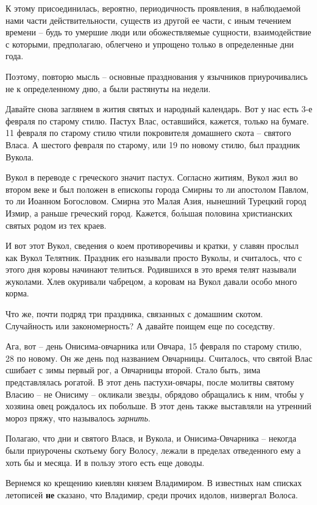    К этому присоединилась, вероятно, периодичность проявления, в наблюдаемой нами части действительности, существ из другой ее части, с иным течением времени – будь то умершие люди или обожествляемые сущности, взаимодействие с которыми, предполагаю, облегчено и упрощено только в определенные дни года.

   Поэтому, повторю мысль – основные празднования у язычников приурочивались не к определенному дню, а были растянуты на недели.

   Давайте снова заглянем в жития святых и народный календарь. Вот у нас есть 3-е февраля по старому стилю. Пастух Влас, оставшийся, кажется, только на бумаге. 11 февраля по старому стилю чтили покровителя домашнего скота – святого Власа. А шестого февраля по старому, или 19 по новому стилю, был праздник Вукола.

   Вукол в переводе с греческого значит пастух. Согласно житиям, Вукол жил во втором веке и был положен в епископы города Смирны то ли апостолом Павлом, то ли Иоанном Богословом. Смирна это Малая Азия, нынешний Турецкий город Измир, а раньше греческий город. Кажется, бо\'льшая половина христианских святых родом из тех краев.

   И вот этот Вукол, сведения о коем противоречивы и кратки, у славян прослыл как Вукол Телятник. Праздник его называли просто Вуколы, и считалось, что с этого дня коровы начинают телиться. Родившихся в это время телят называли жуколами. Хлев окуривали чабрецом, а коровам на Вукол давали особо много корма.

   Что же, почти подряд три праздника, связанных с домашним скотом. Случайность или закономерность? А давайте поищем еще по соседству.

   Ага, вот – день Онисима-овчарника или Овчара, 15 февраля по старому стилю, 28 по новому. Он же день под названием Овчарницы. Считалось, что святой Влас сшибает с зимы первый рог, а Овчарницы второй. Стало быть, зима представлялась рогатой. В этот день пастухи-овчары, после молитвы святому Власию – не Онисиму – окликали звезды, обрядово обращались к ним, чтобы у хозяина овец рождалось их побольше. В этот день также выставляли на утренний мороз пряжу, что называлось \textit{ зарнить}.

   Полагаю, что дни и святого Власв, и Вукола, и Онисима-Овчарника – некогда были приурочены скотьему богу Волосу, лежали в пределах отведенного ему а хоть бы и месяца. И в пользу этого есть еще доводы.

   Вернемся ко крещению киевлян князем Владимиром. В известных нам списках летописей \textbf{не} сказано, что Владимир, среди прочих идолов, низвергал Волоса.

